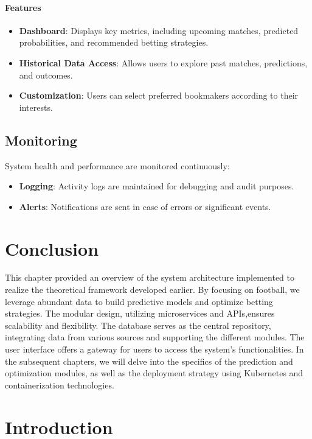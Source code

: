 \paragraph{Features}

\begin{itemize}
    \item \textbf{Dashboard}: Displays key metrics, including upcoming matches, predicted probabilities, and recommended betting strategies.
    \item \textbf{Historical Data Access}: Allows users to explore past matches, predictions, and outcomes.
    \item \textbf{Customization}: Users can select preferred bookmakers according to their interests.
\end{itemize}

\subsection{Monitoring}

System health and performance are monitored continuously:

\begin{itemize}
    \item \textbf{Logging}: Activity logs are maintained for debugging and audit purposes.
    \item \textbf{Alerts}: Notifications are sent in case of errors or significant events.
\end{itemize}


\section{Conclusion}

This chapter provided an overview of the system architecture implemented to realize the theoretical framework developed earlier. By focusing on football, we leverage abundant data to build predictive models and optimize betting strategies. The modular design, utilizing microservices and APIs,ensures scalability and flexibility. The database serves as the central repository, integrating data from various sources and supporting the different modules. The user interface offers a gateway for users to access the system's functionalities. In the subsequent chapters, we will delve into the specifics of the prediction and optimization modules, as well as the deployment strategy using Kubernetes and containerization technologies.

\section{Introduction}
\label{sec:chapter4_intro}

